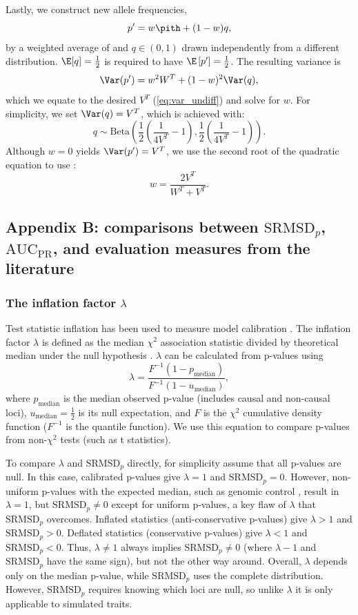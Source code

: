\documentclass[11pt]{article}
\newcommand{\rmsd}{\text{SRMSD}_p}
\newcommand{\auc}{\text{AUC}_\text{PR}}
\begin{document}
Lastly, we construct new allele frequencies,
$$
p' = w \pith + ( 1 - w ) q,
$$
by a weighted average of \pith and $q \in (0, 1)$ drawn independently from a different distribution.
$\E[q] = \frac{1}{2}$ is required to have $\E \left[ p' \right] = \frac{1}{2}$.
The resulting variance is
$$
\Var(p')
=
w^2 W^T + (1-w)^2 \Var(q)
,
$$
which we equate to the desired $V^T$ (\cref{eq:var_undiff}) and solve for $w$.
For simplicity, we set $\Var(q) = V^T$, which is achieved with:
$$
q \sim \text{Beta} \left( \frac{1}{2} \left( \frac{1}{ 4 V^T } - 1 \right), \frac{1}{2} \left( \frac{1}{ 4 V^T } - 1 \right) \right)
.
$$
Although $w=0$ yields $\Var(p') = V^T$, we use the second root of the quadratic equation to use \pith:
$$
w = \frac{ 2 V^T }{ W^T + V^T }.
$$



\subsection{Appendix B: comparisons between $\rmsd$, $\auc$, and evaluation measures from the literature}

\subsubsection{The inflation factor $\lambda$}

Test statistic inflation has been used to measure model calibration \citep{astle_population_2009, price_new_2010}.
The inflation factor $\lambda$ is defined as the median $\chi^2$ association statistic divided by theoretical median under the null hypothesis \citep{devlin_genomic_1999}.
$\lambda$ can be calculated from p-values using
$$
\lambda
=
\frac{
  F^{-1} \left( 1 - p_\text{median} \right)
}{
  F^{-1} \left( 1 - u_\text{median} \right)
}
,
$$
where $p_\text{median}$ is the median observed p-value (includes causal and non-causal loci),
$u_\text{median} = \frac{1}{2}$ is its null expectation,
and $F$ is the $\chi^2$ cumulative density function ($F^{-1}$ is the quantile function).
We use this equation to compare p-values from non-$\chi^2$ tests (such as t statistics).

To compare $\lambda$ and $\rmsd$ directly, for simplicity assume that all p-values are null.
In this case, calibrated p-values give $\lambda = 1$ and $\rmsd = 0$.
However, non-uniform p-values with the expected median, such as genomic control \citep{devlin_genomic_1999}, result in $\lambda = 1$, but $\rmsd \ne 0$ except for uniform p-values, a key flaw of $\lambda$ that $\rmsd$ overcomes.
Inflated statistics (anti-conservative p-values) give $\lambda > 1$ and $\rmsd > 0$.
Deflated statistics (conservative p-values) give $\lambda < 1$ and $\rmsd < 0$.
Thus, $\lambda \ne 1$ always implies $\rmsd \ne 0$ (where $\lambda - 1$ and $\rmsd$ have the same sign), but not the other way around.
Overall, $\lambda$ depends only on the median p-value, while $\rmsd$ uses the complete distribution.
However, $\rmsd$ requires knowing which loci are null, so unlike $\lambda$ it is only applicable to simulated traits.
\end{document}
